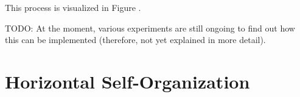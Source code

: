 This process is visualized in Figure . 


TODO: At the moment, various experiments are still ongoing to find out how this can be implemented (therefore, not yet explained in more detail).







\section{Horizontal Self-Organization}

















